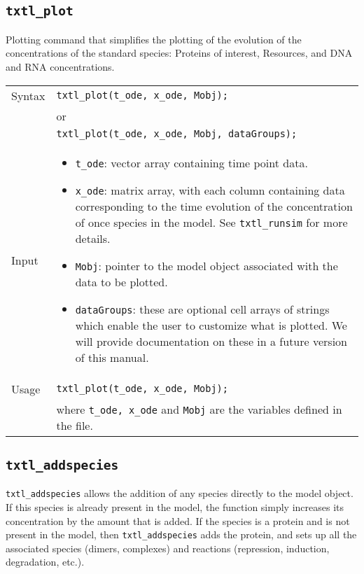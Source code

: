 		\subsection*{\texttt{txtl\_plot}}
		Plotting command that simplifies the plotting of the evolution of the concentrations of the standard species: Proteins of interest, Resources, and DNA and RNA concentrations. \\
		
		\begin{tabular}{p{2cm}|p{13cm}}
			Syntax & \texttt{txtl\_plot(t\_ode, x\_ode, Mobj);}\\
			& or \\
			& \texttt{txtl\_plot(t\_ode, x\_ode, Mobj, dataGroups);}\\		 \hline
			Input &  \begin{itemize}
				\item \texttt{t\_ode}: vector array containing time point data. 
				\item \texttt{x\_ode}: matrix array, with each column containing data corresponding to the time evolution of the concentration of once species in the model. See \texttt{txtl\_runsim} for more details.  
				\item \texttt{Mobj}: pointer to the model object associated with the data to be plotted.
				\item \texttt{dataGroups}: these are optional cell arrays of strings which enable the user to customize what is plotted. We will provide documentation on these in a future version of this manual.  
				\end{itemize} \\ \hline
			Usage & \texttt{txtl\_plot(t\_ode, x\_ode, Mobj);}\\
			& where \texttt{t\_ode, x\_ode} and \texttt{Mobj} are the variables defined in the file. 
			\end{tabular}
		
		
		\subsection*{\texttt{txtl\_addspecies}}
			\texttt{txtl\_addspecies} allows the addition of any species directly to the model object. If this species is already present in the model, the function simply increases its concentration by the amount that is added. If the species is a protein and is not present in the model, then \texttt{txtl\_addspecies} adds the protein, and sets up all the associated species (dimers, complexes) and reactions (repression, induction, degradation, etc.). \\
			
